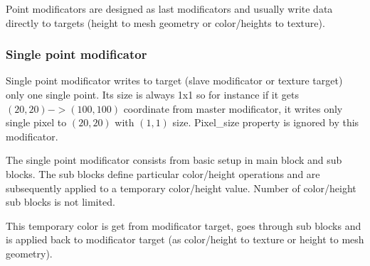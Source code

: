 \documentclass[9pt]{article}
\begin{document}
Point modificators are designed as last modificators and usually write
data directly to targets (height to mesh geometry or color/heights to texture). 

\subsubsection{Single point modificator}

Single point modificator writes to target (slave modificator
or texture target) only one single point. Its size is always 1x1 so for instance
if it gets \begin{math}(20,20) -> (100,100)\end{math} coordinate 
from master modificator, it writes only single pixel to \begin{math}(20,20)\end{math} 
with \begin{math}(1,1)\end{math} size. Pixel\_size property is ignored 
by this modificator.

The single point modificator consists from basic setup in main block and
sub blocks. The sub blocks define particular color/height operations and 
are subsequently applied to a temporary color/height value. Number of 
color/height sub blocks is not limited.

This temporary color is get from modificator target, goes through sub blocks
and is applied back to modificator target (as color/height to texture or
height to mesh geometry). 
\end{document}
